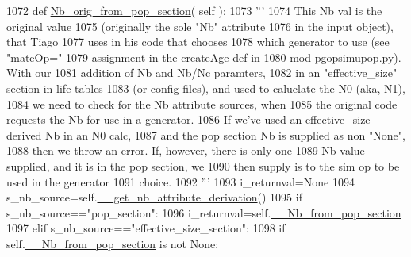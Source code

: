 \begin{DoxyCode}
1072     \textcolor{keyword}{def }\hyperlink{classnegui_1_1pginputsimupop_1_1PGInputSimuPop_aeb297f90a0b2af488b18c12bbdd103f9}{Nb\_orig\_from\_pop\_section}( self ):
1073         \textcolor{stringliteral}{'''}
1074 \textcolor{stringliteral}{        This Nb val is the original value}
1075 \textcolor{stringliteral}{        (originally the sole "Nb" attribute}
1076 \textcolor{stringliteral}{        in the input object), that Tiago }
1077 \textcolor{stringliteral}{        uses in his code that chooses}
1078 \textcolor{stringliteral}{        which generator to use (see "mateOp="}
1079 \textcolor{stringliteral}{        assignment in the createAge def in}
1080 \textcolor{stringliteral}{        mod pgopsimupop.py).  With our}
1081 \textcolor{stringliteral}{        addition of Nb and Nb/Nc  paramters,}
1082 \textcolor{stringliteral}{        in an "effective\_size" section in life tables}
1083 \textcolor{stringliteral}{        (or config files), and used to caluclate the N0 (aka, N1),}
1084 \textcolor{stringliteral}{        we need to check for the Nb attribute sources, when}
1085 \textcolor{stringliteral}{        the original code requests the Nb for use in a generator.}
1086 \textcolor{stringliteral}{        If we've used an effective\_size-derived Nb in an N0 calc, }
1087 \textcolor{stringliteral}{        and the pop section Nb is supplied as non "None",}
1088 \textcolor{stringliteral}{        then we throw an error.  If, however, there is only one}
1089 \textcolor{stringliteral}{        Nb value supplied, and it is in the pop section, we }
1090 \textcolor{stringliteral}{        then supply is to the sim op to be used in the generator}
1091 \textcolor{stringliteral}{        choice.}
1092 \textcolor{stringliteral}{        '''}
1093         i\_returnval=\textcolor{keywordtype}{None}
1094         s\_nb\_source=self.\hyperlink{classnegui_1_1pginputsimupop_1_1PGInputSimuPop_ab22ca7220fa560cf8c7b4d8b6bcb87f3}{\_\_get\_nb\_attribute\_derivation}()
1095         \textcolor{keywordflow}{if} s\_nb\_source==\textcolor{stringliteral}{"pop\_section"}:
1096             i\_returnval=self.\hyperlink{classnegui_1_1pginputsimupop_1_1PGInputSimuPop_a2525ee53b93e309b99914e0cdf175901}{\_\_Nb\_from\_pop\_section}
1097         \textcolor{keywordflow}{elif} s\_nb\_source==\textcolor{stringliteral}{"effective\_size\_section"}:
1098             \textcolor{keywordflow}{if} self.\hyperlink{classnegui_1_1pginputsimupop_1_1PGInputSimuPop_a2525ee53b93e309b99914e0cdf175901}{\_\_Nb\_from\_pop\_section} \textcolor{keywordflow}{is} \textcolor{keywordflow}{not} \textcolor{keywordtype}{None}:

\end{DoxyCode}
